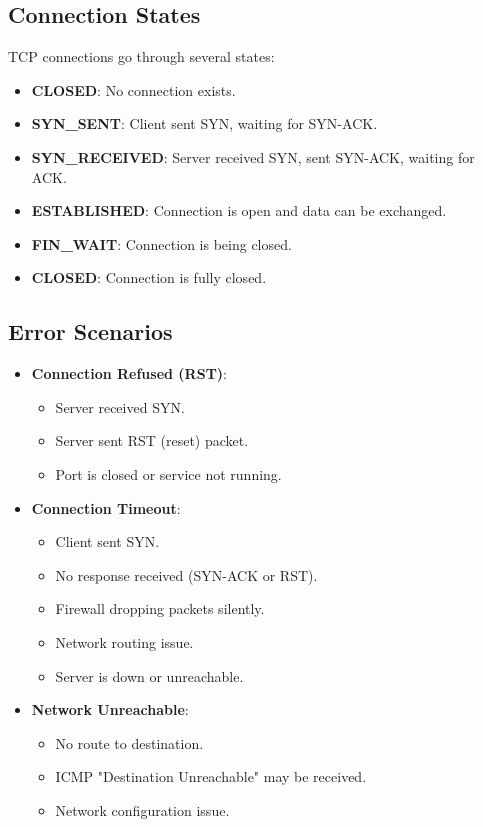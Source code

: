 \subsection{Connection States}

TCP connections go through several states:

\begin{itemize}
    \item \textbf{CLOSED}: No connection exists.
    \item \textbf{SYN\_SENT}: Client sent SYN, waiting for SYN-ACK.
    \item \textbf{SYN\_RECEIVED}: Server received SYN, sent SYN-ACK, waiting for ACK.
    \item \textbf{ESTABLISHED}: Connection is open and data can be exchanged.
    \item \textbf{FIN\_WAIT}: Connection is being closed.
    \item \textbf{CLOSED}: Connection is fully closed.
\end{itemize}

\subsection{Error Scenarios}

\begin{itemize}
    \item \textbf{Connection Refused (RST)}:
    \begin{itemize}
        \item Server received SYN.
        \item Server sent RST (reset) packet.
        \item Port is closed or service not running.
    \end{itemize}
    
    \item \textbf{Connection Timeout}:
    \begin{itemize}
        \item Client sent SYN.
        \item No response received (SYN-ACK or RST).
        \item Firewall dropping packets silently.
        \item Network routing issue.
        \item Server is down or unreachable.
    \end{itemize}
    
    \item \textbf{Network Unreachable}:
    \begin{itemize}
        \item No route to destination.
        \item ICMP "Destination Unreachable" may be received.
        \item Network configuration issue.
    \end{itemize}
\end{itemize}

